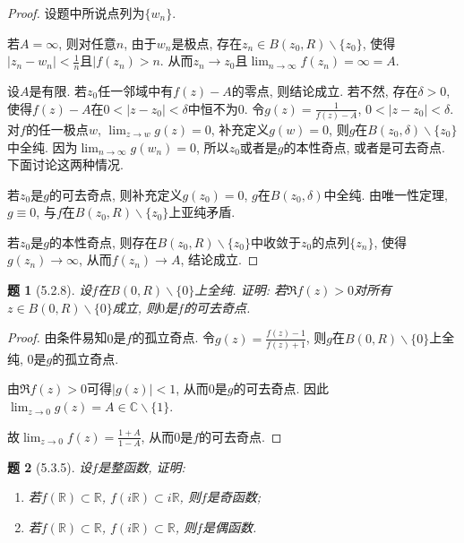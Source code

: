 \documentclass{article}[a4paper, 12pt]
\theoremstyle{mystyle}
\newtheorem{problem}{题}
\begin{document}
\begin{proof}
  设题中所说点列为\(\{w_n\}\).

  若\(A=\infty\), 则对任意\(n\), 由于\(w_n\)是极点, 存在\(z_n\in B(z_0,R)\backslash\{z_0\}\), 使得\(|z_n-w_n|<\frac1n\)且\(|f(z_n)>n\). 从而\(z_n\to z_0\)且\(\lim_{n\to\infty}f(z_n)=\infty=A\).

  设\(A\)是有限. 若\(z_0\)任一邻域中有\(f(z)-A\)的零点, 则结论成立. 若不然, 存在\(\delta>0\), 使得\(f(z)-A\)在\(0<|z-z_0|<\delta\)中恒不为\(0\). 令\(g(z)=\frac{1}{f(z)-A}\), \(0<|z-z_0|<\delta\). 对\(f\)的任一极点\(w\), \(\lim_{z\to w}g(z)=0\), 补充定义\(g(w)=0\), 则\(g\)在\(B(z_0,\delta)\backslash\{z_0\}\)中全纯. 因为\(\lim_{n\to\infty}g(w_n)=0\), 所以\(z_0\)或者是\(g\)的本性奇点, 或者是可去奇点. 下面讨论这两种情况.

  若\(z_0\)是\(g\)的可去奇点, 则补充定义\(g(z_0)=0\), \(g\)在\(B(z_0,\delta)\)中全纯. 由唯一性定理, \(g\equiv0\), 与\(f\)在\(B(z_0,R)\backslash\{z_0\}\)上亚纯矛盾.

  若\(z_0\)是\(g\)的本性奇点, 则存在\(B(z_0,R)\backslash\{z_0\}\)中收敛于\(z_0\)的点列\(\{z_n\}\), 使得\(g(z_n)\to\infty\), 从而\(f(z_n)\to A\), 结论成立.
\end{proof}

\begin{problem}[5.2.8]
  设\(f\)在\(B(0,R)\backslash\{0\}\)上全纯. 证明: 若\(\Re f(z)>0\)对所有\(z\in B(0,R)\backslash\{0\}\)成立, 则\(0\)是\(f\)的可去奇点.
\end{problem}

\begin{proof}
  由条件易知\(0\)是\(f\)的孤立奇点. 令\(g(z)=\frac{f(z)-1}{f(z)+1}\), 则\(g\)在\(B(0,R)\backslash\{0\}\)上全纯, \(0\)是\(g\)的孤立奇点.

  由\(\Re f(z)>0\)可得\(|g(z)|<1\), 从而\(0\)是\(g\)的可去奇点. 因此\(\lim_{z\to0}g(z)=A\in\mathbb{C}\backslash\{1\}\). 

  故\(\lim_{z\to0}f(z)=\frac{1+A}{1-A}\), 从而\(0\)是\(f\)的可去奇点.
\end{proof}

\begin{problem}[5.3.5]
  设\(f\)是整函数, 证明:
  \begin{enumerate}
    \item 若\(f(\mathbb R)\subset \mathbb{R}\), \(f(i\mathbb R)\subset i\mathbb R\), 则\(f\)是奇函数;
    \item 若\(f(\mathbb R)\subset \mathbb R\), \(f(i\mathbb R)\subset \mathbb R\), 则\(f\)是偶函数.
  \end{enumerate}
\end{problem}
\end{document}
